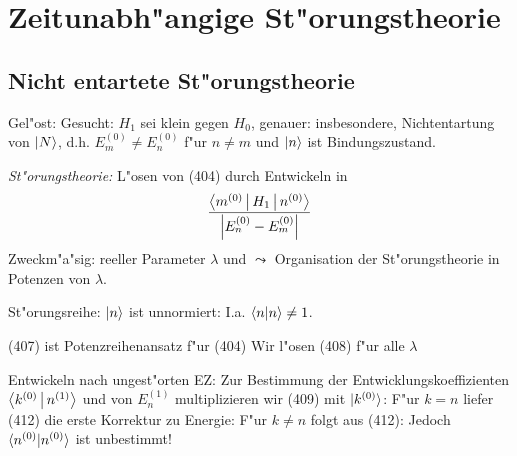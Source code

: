 \documentclass[a4paper]{scrartcl}
\begin{document}
{\section{Zeitunabh"angige St"orungstheorie}

\subsection{Nicht entartete St"orungstheorie}

Gel"ost:
Gesucht:
$H_1$ sei klein gegen $H_0$, genauer:
insbesondere, Nichtentartung von $\Ket N$, d.h. $E_m^{(0)} \neq E_n^{(0)}$ f"ur $n \neq m$ und $\Ket n$ ist Bindungszustand.

\emph{St"orungstheorie:} L"osen von (404) durch Entwickeln in 
$$\frac{ \Braket{ m^{(0)} | H_1 | n^{(0)}} }{\left\vert E_n^{(0)} - E_m^{(0)} \right\vert}$$
Zweckm"a"sig: reeller Parameter $\lambda$ und
$\leadsto$ Organisation der St"orungstheorie in Potenzen von $\lambda$. 

St"orungsreihe:
$\Ket n$ ist unnormiert: I.a. $\braket {n | n } \neq 1$.

(407) ist Potenzreihenansatz f"ur (404)
Wir l"osen (408) f"ur alle $\lambda$
}
Entwickeln nach ungest"orten EZ:
Zur Bestimmung der Entwicklungskoeffizienten $\Braket{ k^{(0)} | n^{(1)}}$ und von $E_n^{(1)}$ multiplizieren wir (409) mit $\ket{ k^{(0)}}$:
F"ur $k=n$ liefer (412) die erste Korrektur zu Energie:
F"ur $k \neq n$ folgt aus (412):
Jedoch $\braket{ n^{(0)} | n^{(0)}}$ ist unbestimmt!
\end{document}
